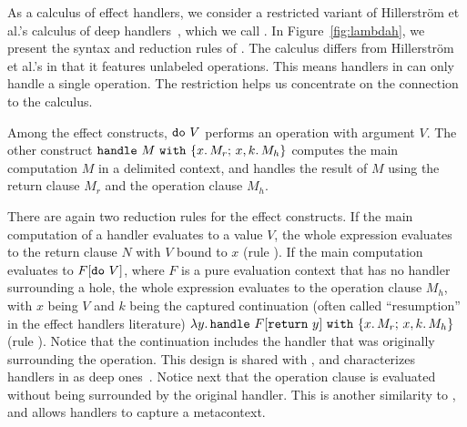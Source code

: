 As a calculus of effect handlers, we consider a restricted variant of
Hillerstr\"om et al.'s calculus of deep handlers~\cite{hillerstrom-cps},
which we call \lambdah.
In Figure~\ref{fig:lambdah}, we present the syntax and reduction rules
of \lambdah.
The calculus differs from Hillerstr\"om et al.'s in that it features
unlabeled operations.
This means handlers in \lambdah can only handle a single operation.
The restriction helps us concentrate on the connection to the \lambdasz
calculus.

Among the effect constructs, $\texttt{do} \ V$ performs an operation with
argument $V$.
The other construct $\texttt{handle} \ M \ \texttt{with} \ \{ x. \, M_r; \, x, k. \, M_h \}$ computes the main
computation $M$ in a delimited context, and handles the result of $M$
using the return clause $M_r$ and the operation clause $M_h$.

There are again two reduction rules for the effect constructs.
If the main computation of a handler evaluates to a value $V$, the whole
expression evaluates to the return clause $N$ with $V$ bound to $x$
(rule ).
If the main computation evaluates to $F[\texttt{do} \ V]$, where $F$ is a pure
evaluation context that has no handler surrounding a hole, the whole expression
evaluates to the operation clause $M_h$, with $x$ being $V$ and $k$ being
the captured continuation (often called ``resumption'' in the effect handlers
literature) $\lambda y.\, \texttt{handle} \ F[\texttt{return} \ y] \ \texttt{with} \ \{ x. \, M_r; \, x, k. \, M_h \}$
(rule ).
Notice that the continuation includes the handler that was originally
surrounding the operation.
This design is shared with \shiftztt, and characterizes handlers in
\lambdah as deep ones~\cite{kammar-handler}.
Notice next that the operation clause is evaluated without being surrounded
by the original handler.
This is another similarity to \shiftztt, and allows handlers to capture
a metacontext.

\Lambdah
